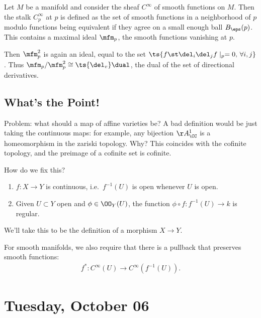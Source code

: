 \begin{example}

Let \(M\) be a manifold and consider the sheaf \(C^\infty\) of smooth
functions on \(M\). Then the stalk \(C_p^\infty\) at \(p\) is defined as
the set of smooth functions in a neighborhood of \(p\) modulo functions
being equivalent if they agree on a small enough ball \(B_\eps(p)\).
This contains a maximal ideal \(\mfm_p\), the smooth functions vanishing
at \(p\).

Then \(\mfm_p^2\) is again an ideal, equal to the set
\(\ts{f \st \del_i \del_j f\mid_p = 0,\, \forall i,j}\). Thus
\(\mfm_p/\mfm_p^2 \cong \ts{\del_v}\dual\), the dual of the set of
directional derivatives.

\end{example}

\hypertarget{whats-the-point}{%
\subsection{What's the Point!}\label{whats-the-point}}

Problem: what should a map of affine varieties be? A bad definition
would be just taking the continuous maps: for example, any bijection
\(\AA_\CC^1\) is a homeomorphism in the zariski topology. Why? This
coincides with the cofinite topology, and the preimage of a cofinite set
is cofinite.

How do we fix this?

\begin{enumerate}
\def\labelenumi{\arabic{enumi}.}
\item
  \(f:X\to Y\) is continuous, i.e.~\(f^{-1} (U)\) is open whenever \(U\)
  is open.
\item
  Given \(U\subset Y\) open and \(\phi \in \OO_Y(U)\), the function
  \(\phi \circ f: f^{-1}(U) \to k\) is regular.
\end{enumerate}

We'll take this to be the definition of a morphism \(X\to Y\).

\begin{example}

For smooth manifolds, we also require that there is a pullback that
preserves smooth functions:
\begin{align*}  
f^*: C^\infty(U) \to C^\infty(f^{-1}(U))
.\end{align*}

\end{example}

\hypertarget{tuesday-october-06}{%
\section{Tuesday, October 06}\label{tuesday-october-06}}


